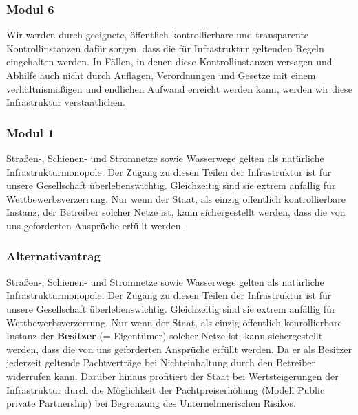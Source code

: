 \subsubsection{Modul 6}
\abstimmung
Wir werden durch geeignete, öffentlich kontrollierbare und transparente Kontrollinstanzen dafür sorgen, dass die für Infrastruktur geltenden Regeln eingehalten werden. In Fällen, in denen diese Kontrollinstanzen versagen und Abhilfe auch nicht durch Auflagen, Verordnungen und Gesetze mit einem verhältnismäßigen und endlichen Aufwand erreicht werden kann, werden wir diese Infrastruktur verstaatlichen.
 
\label{wp:monopol:netz1}

\subsubsection{Modul 1}
\abstimmung
Straßen-, Schienen- und Stromnetze sowie Wasserwege gelten als natürliche Infrastrukturmonopole. Der Zugang zu diesen Teilen der Infrastruktur ist für unsere Gesellschaft überlebenswichtig. Gleichzeitig sind sie extrem anfällig für Wettbewerbsverzerrung. Nur wenn der Staat, als einzig öffentlich kontrollierbare Instanz, der Betreiber solcher Netze ist, kann sichergestellt werden, dass die von uns geforderten Ansprüche erfüllt werden.
 
\label{wp:monopol:netz2}

\subsubsection{Alternativantrag}
\abstimmung
Straßen-, Schienen- und Stromnetze sowie Wasserwege gelten als natürliche Infrastrukturmonopole. Der Zugang zu diesen Teilen der Infrastruktur ist für unsere Gesellschaft überlebenswichtig. Gleichzeitig sind sie extrem anfällig für Wettbewerbsverzerrung. Nur wenn der Staat, als einzig öffentlich konrollierbare Instanz der \textbf{Besitzer} (= Eigentümer) solcher Netze ist, kann sichergestellt werden, dass die von uns geforderten Ansprüche erfüllt werden. Da er als Besitzer jederzeit geltende Pachtverträge bei Nichteinhaltung durch den Betreiber widerrufen kann. Darüber hinaus profitiert der Staat bei Wertsteigerungen der Infrastruktur durch die Möglichkeit der Pachtpreiserhöhung (Modell Public private Partnership) bei Begrenzung des Unternehmerischen Risikos.
 
